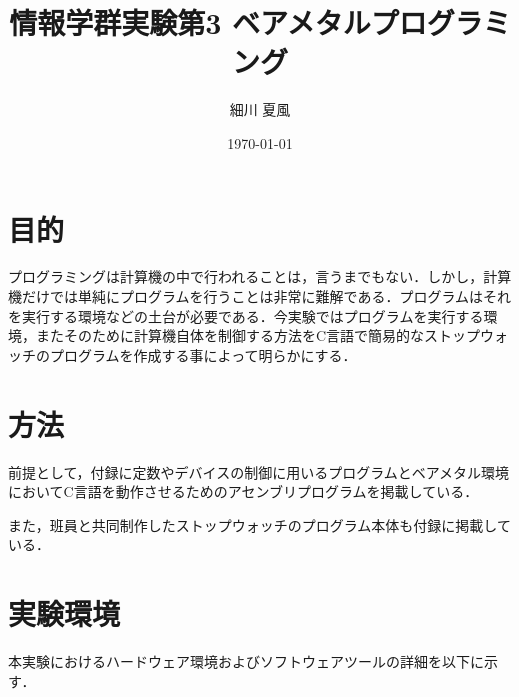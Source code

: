 \documentclass{jlreq}
\title{情報学群実験第3 ベアメタルプログラミング}
\author{細川 夏風}
\date{\today}
\begin{document}
  \maketitle

  \section{目的}
  プログラミングは計算機の中で行われることは，言うまでもない．しかし，計算機だけでは単純にプログラムを行うことは非常に難解である．プログラムはそれを実行する環境などの土台が必要である．今実験ではプログラムを実行する環境，またそのために計算機自体を制御する方法をC言語で簡易的なストップウォッチのプログラムを作成する事によって明らかにする．

  \section{方法}
  前提として，付録に定数やデバイスの制御に用いるプログラムとベアメタル環境においてC言語を動作させるためのアセンブリプログラムを掲載している．

  \vspace{1em}

  また，班員と共同制作したストップウォッチのプログラム本体も付録に掲載している．

  \section{実験環境}
  本実験におけるハードウェア環境およびソフトウェアツールの詳細を以下に示す．
\end{document}
